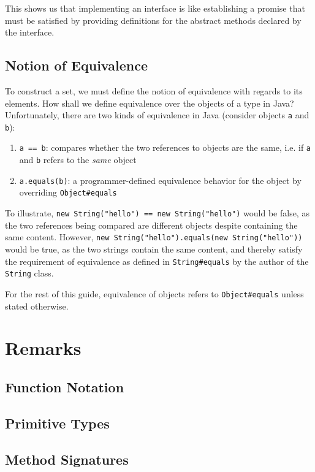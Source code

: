 \documentclass[12pt]{article}
\theoremstyle{definition}
\newcommand{\code}[1]{\colorbox{codegray}{\texttt{#1}}}
\begin{document}
	This shows us that implementing an interface is like establishing a promise that must be satisfied by providing definitions for the abstract methods declared by the interface.
	
	\subsection{Notion of Equivalence}
	
	To construct a set, we must define the notion of equivalence with regards to its elements. How shall we define equivalence over the objects of a type in Java? Unfortunately, there are two kinds of equivalence in Java (consider objects \code{a} and \code{b}):
	\begin{enumerate}
		\item \code{a == b}: compares whether the two references to objects are the same, i.e. if \code{a} and \code{b} refers to the \emph{same} object
		\item \code{a.equals(b)}: a programmer-defined equivalence behavior for the object by overriding \code{Object\#equals}
	\end{enumerate}
	
	To illustrate, \code{new String("hello") == new String("hello")} would be false, as the two references being compared are different objects despite containing the same content. However, \code{new String("hello").equals(new String("hello"))} would be true, as the two strings contain the same content, and thereby satisfy the requirement of equivalence as defined in \code{String\#equals} by the author of the \code{String} class.
	
	For the rest of this guide, equivalence of objects refers to \code{Object\#equals} unless stated otherwise.
	
	\section{Remarks}
	
	\subsection{Function Notation}
	
	\subsection{Primitive Types}
	\label{sec:primitives}
	
	\subsection{Method Signatures}
	\label{sec:signature}
	
\end{document}

